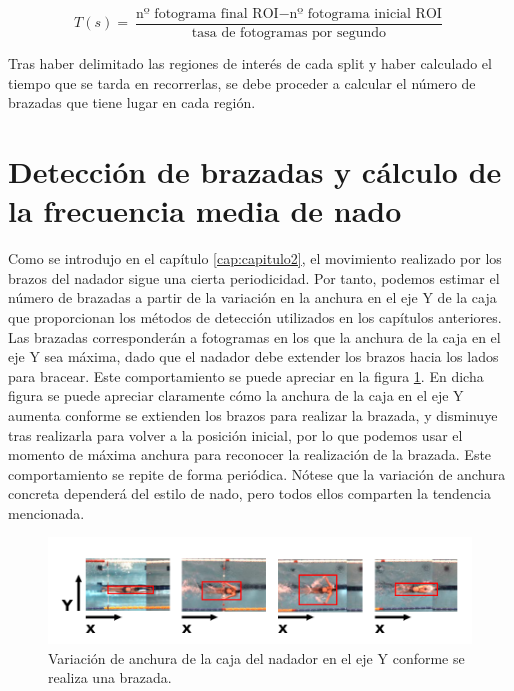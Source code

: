 \begin{equation}
    T (s) = \frac{\text{nº fotograma final ROI} - \text{nº fotograma inicial ROI}}{ \text{tasa de fotogramas por segundo}}
\end{equation}

Tras haber delimitado las regiones de interés de cada split y haber calculado el tiempo que se tarda en recorrerlas, se debe proceder a calcular el número de brazadas que tiene lugar en cada región.

\section{Detección de brazadas y cálculo de la frecuencia media de nado} \label{sec:brazadassplit}

Como se introdujo en el capítulo \ref{cap:capitulo2}, el movimiento realizado por los brazos del nadador sigue una cierta periodicidad. Por tanto, podemos estimar el número de brazadas a partir de la variación en la anchura en el eje Y de la caja que proporcionan los métodos de detección utilizados en los capítulos anteriores. Las brazadas corresponderán a fotogramas en los que la anchura de la caja en el eje Y sea máxima, dado que el nadador debe extender los brazos hacia los lados para bracear. Este comportamiento se puede apreciar  en la figura \ref{fig:vervariacionanchura}. En dicha figura se puede apreciar claramente cómo la anchura de la caja en el eje Y aumenta conforme se extienden los brazos para realizar la brazada, y disminuye tras realizarla para volver a la posición inicial, por lo que podemos usar el momento de máxima anchura para reconocer la realización de la brazada. Este comportamiento se repite de forma periódica. Nótese que la variación de anchura concreta dependerá del estilo de nado, pero todos ellos comparten la tendencia mencionada.

\begin{figure}
    \centering
    \includegraphics[width=\textwidth,height=\textheight,keepaspectratio]{imagenes/parte_graficas/variacion_anchura_nadador.png}
    \caption{Variación de anchura de la caja del nadador en el eje Y conforme se realiza una brazada.}
    \label{fig:vervariacionanchura}
\end{figure}

